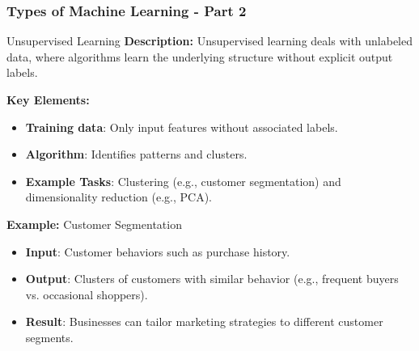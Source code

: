 \documentclass[aspectratio=169]{beamer}
\begin{document}
\begin{frame}[fragile]
    \frametitle{Types of Machine Learning - Part 2}
    \begin{block}{Unsupervised Learning}
        \textbf{Description:}
        Unsupervised learning deals with unlabeled data, where algorithms learn the underlying structure without explicit output labels.

        \textbf{Key Elements:}
        \begin{itemize}
            \item \textbf{Training data}: Only input features without associated labels.
            \item \textbf{Algorithm}: Identifies patterns and clusters.
            \item \textbf{Example Tasks}: Clustering (e.g., customer segmentation) and dimensionality reduction (e.g., PCA).
        \end{itemize}
        
        \textbf{Example:} Customer Segmentation
        \begin{itemize}
            \item \textbf{Input}: Customer behaviors such as purchase history.
            \item \textbf{Output}: Clusters of customers with similar behavior (e.g., frequent buyers vs. occasional shoppers).
            \item \textbf{Result}: Businesses can tailor marketing strategies to different customer segments.
        \end{itemize}
    \end{block}
\end{frame}
\end{document}
